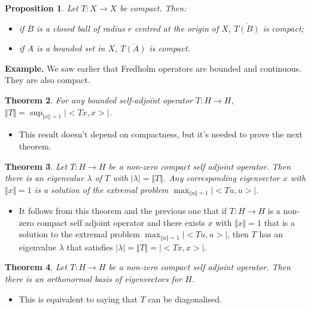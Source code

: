 \documentclass[two column]{article}
\newtheorem{theorem}{Theorem}[subsection]
\newtheorem{proposition}[theorem]{Proposition}
\begin{document}
\begin{proposition}
Let $T : X \rightarrow X$ be compact. Then:
\begin{itemize}
\item if $B$ is a closed ball of radius $r$ centred at the origin of $X$, $\overline{T(B)}$ is compact;
\item if $A$ is a bounded set in $X$, $\overline{T(A)}$ is compact. \vspace{5pt}
\end{itemize}
\end{proposition}

{\bf Example.} We saw earlier that Fredholm operators are bounded and continuous. They are also compact. \\

\begin{theorem}
For any bounded self-adjoint operator $T : H \rightarrow H$, $\Vert T \Vert = \sup_{\Vert x \Vert = 1} \vert < Tx, x > \vert$.
\end{theorem}
\begin{itemize}
\item This result doesn't depend on compactness, but it's needed to prove the next theorem. \\
\end{itemize}

\begin{theorem}
Let $T : H \rightarrow H$ be a non-zero compact self adjoint operator. Then there is an eigenvalue $\lambda$ of $T$ with $\vert \lambda \vert = \Vert T \Vert$. Any corresponding eigenvector $x$ with $\Vert x \Vert = 1$ is a solution of the extremal problem $\max_{\Vert u \Vert = 1} \vert < Tu, u > \vert$. 
\end{theorem}
\begin{itemize}
\item It follows from this theorem and the previous one that if $T : H \rightarrow H$ is a non-zero compact self adjoint operator and there exists $x$ with $\Vert x \Vert = 1$ that is a solution to the extremal problem $\max_{\Vert u \Vert = 1} \vert < Tu, u > \vert$, then $T$ has an eigenvalue $\lambda$ that satisfies $\vert \lambda \vert = \Vert T \Vert = \vert < Tx, x > \vert$. \\
\end{itemize}

\begin{theorem}
Let $T : H \rightarrow H$ be a non-zero compact self adjoint operator. Then there is an orthonormal basis of eigenvectors for $H$. 
\end{theorem}
\begin{itemize}
\item This is equivalent to saying that $T$ can be diagonalised. \\
\end{itemize}
\end{document}

